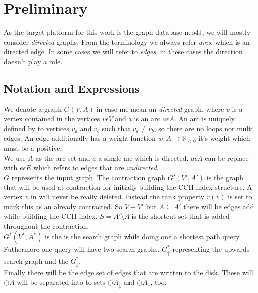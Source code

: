 \chapter{Preliminary}

As the target platform for this work is the graph database neo4J, we will mostly consider \textit{directed} graphs. From the terminology we always refer \textit{arcs}, which is an directed edge.
In some cases we will refer to \textit{edges}, in these cases the direction doesn't play a role.

\section{Notation and Expressions}
We denote a graph $G(V, A)$ in case me mean an \textit{directed} graph, where $v$ is a vertex contained in the vertices $v \epsilon  V$ and $a$ is an
arc $a \epsilon A$. An arc is uniquely defined by to vertices $v_a$ and $v_b$ such that $v_a \neq v_b$, so there are no loops nor multi edges.
An edge additionally has a weight function $w: A \rightarrow \mathbb{R}_{<0} $ it's weight which must be a positive.
\\
We use $A$ as the arc set and $a$ a single arc which is directed. $a \epsilon A$ can be replace with $e \epsilon E$ which refers to edges that are \textit{undirected}. 
\\
$G$ represents the input graph. The contraction graph $G'(V', A')$ is the graph that will be used at contraction for initially building the CCH index structure. A vertex $v$ in will 
never be really deleted. Instead the rank property $r(v)$ is set to mark this as an already contracted. So $V \equiv V'$ but $A \subseteq A'$ there will be edges add while building
the CCH index. $S = A' \setminus A$ is the shortcut set that is added throughout the contraction. 
\\
$G^*(V^*, A^*)$ is the is the search graph while doing one a shortest path query. Futhermore one query will have two search graphs. $G^*_\uparrow$ representing the upwards search graph
and the $G^*_\downarrow$.
\\
Finally there will be the edge set of edges that are written to the disk. These will $\bigcirc A$ will be separated into to sets $\bigcirc A_\downarrow$ and $\bigcirc A_\uparrow $, too.




